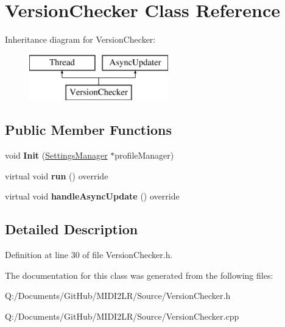 \hypertarget{class_version_checker}{}\section{Version\+Checker Class Reference}
\label{class_version_checker}
Inheritance diagram for Version\+Checker\+:\begin{figure}[H]
\begin{center}
\leavevmode
\includegraphics[height=2.000000cm]{class_version_checker}
\end{center}
\end{figure}
\subsection*{Public Member Functions}
\begin{DoxyCompactItemize}
\item 
void {\bfseries Init} (\hyperlink{class_settings_manager}{Settings\+Manager} $\ast$profile\+Manager)\hypertarget{class_version_checker_ac8f448cf1ee019da5b84e3ce7e0a52bd}{}\label{class_version_checker_ac8f448cf1ee019da5b84e3ce7e0a52bd}

\item 
virtual void {\bfseries run} () override\hypertarget{class_version_checker_a04beca4aadd6a6df974c1c07f5113f7b}{}\label{class_version_checker_a04beca4aadd6a6df974c1c07f5113f7b}

\item 
virtual void {\bfseries handle\+Async\+Update} () override\hypertarget{class_version_checker_a3be0b90040969fec02cc547f7012accc}{}\label{class_version_checker_a3be0b90040969fec02cc547f7012accc}

\end{DoxyCompactItemize}


\subsection{Detailed Description}


Definition at line 30 of file Version\+Checker.\+h.



The documentation for this class was generated from the following files\+:\begin{DoxyCompactItemize}
\item 
Q\+:/\+Documents/\+Git\+Hub/\+M\+I\+D\+I2\+L\+R/\+Source/Version\+Checker.\+h\item 
Q\+:/\+Documents/\+Git\+Hub/\+M\+I\+D\+I2\+L\+R/\+Source/Version\+Checker.\+cpp\end{DoxyCompactItemize}
